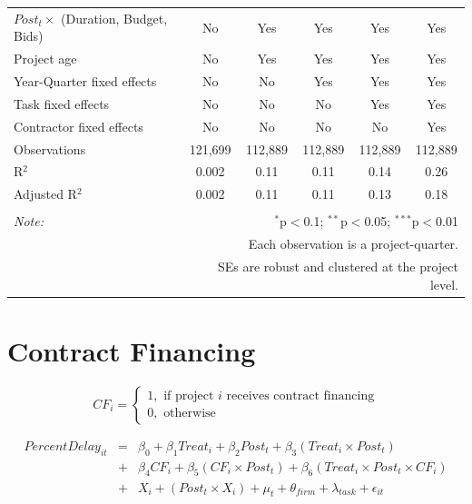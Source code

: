 \documentclass[
]{article}
\begin{document}
\begin{table}[H]
\begin{tabular}{@{\extracolsep{-2pt}}lccccc}
$Post_t \times$  (Duration, Budget, Bids) & No & Yes & Yes & Yes & Yes \\ 
Project age & No & Yes & Yes & Yes & Yes \\ 
Year-Quarter fixed effects & No & No & Yes & Yes & Yes \\ 
Task fixed effects & No & No & No & Yes & Yes \\ 
Contractor fixed effects & No & No & No & No & Yes \\ 
Observations & 121,699 & 112,889 & 112,889 & 112,889 & 112,889 \\ 
R$^{2}$ & 0.002 & 0.11 & 0.11 & 0.14 & 0.26 \\ 
Adjusted R$^{2}$ & 0.002 & 0.11 & 0.11 & 0.13 & 0.18 \\ 
\hline 
\hline \\[-1.8ex] 
\textit{Note:}  & \multicolumn{5}{r}{$^{*}$p$<$0.1; $^{**}$p$<$0.05; $^{***}$p$<$0.01} \\ 
 & \multicolumn{5}{r}{Each observation is a project-quarter.} \\ 
 & \multicolumn{5}{r}{SEs are robust and clustered at the project level.} \\ 
\end{tabular} 
\end{table}

\hypertarget{contract-financing}{%
\section{Contract Financing}\label{contract-financing}}

\[ CF_i = \begin{cases} 1, \text{ if project } i \text{ receives contract financing}\\
0, \text{ otherwise} \end{cases}\]

\[ \begin{aligned}
PercentDelay_{it} &=& \beta_0+\beta_1 Treat_i + \beta_2 Post_t + \beta_3 (Treat_i \times Post_t) \\
&+&\beta_4 CF_i + \beta_5 (CF_i \times Post_t) + \beta_6 (Treat_i \times Post_t \times CF_i) \\ 
&+&X_i + (Post_t \times X_i) + \mu_t + \theta_{firm} + \lambda_{task}+ \epsilon_{it}
\end{aligned}\]
\end{document}
